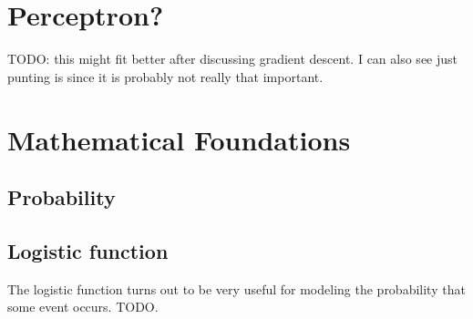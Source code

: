 \documentclass[assignment03_Solutions]{subfiles}
\begin{document}
\section{Perceptron?}
TODO: this might fit better after discussing gradient descent.  I can also see just punting is since it is probably not really that important.

\section{Mathematical Foundations}
\subsection{Probability}

\subsection{Logistic function}

The logistic function turns out to be very useful for modeling the probability that some event occurs.  TODO.
\end{document}
